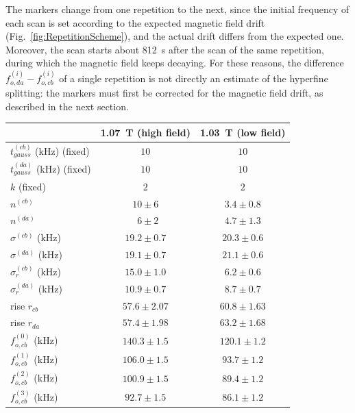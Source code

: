 The markers change from one repetition to the next, since the initial frequency of each scan is set according to the expected magnetic field drift (Fig.~\ref{fig:RepetitionScheme}), and the actual drift differs from the expected one. Moreover, the \da scan starts about \SI{812}{\second} after the \cb scan of the same repetition, during which the magnetic field keeps decaying. For these reasons, the difference $f_{o,da}^{(i)} - f_{o,cb}^{(i)}$ of a single repetition is not directly an estimate of the hyperfine splitting: the markers must first be corrected for the magnetic field drift, as described in the next section.

\begin{table}[!h]
\centering
\begin{tabular}{l|cc}
\hline
\hline
\textbf{} & \textbf{\SI{1.07}{\tesla} (high field)}  &  \textbf{\SI{1.03}{\tesla} (low field)}  \\
\hline 
$t_{gauss}^{(cb)}$ (kHz) (fixed) & $10$ & $10$ \\
$t_{gauss}^{(da)}$ (kHz) (fixed) & $10$ & $10$ \\
\hline
$k$ (fixed) &  $2$ &  $2$ \\
$n^{(cb)}$                &  $ 10 \pm 6$	         & $ 3.4    \pm 0.8 $\\
$n^{(da)}$                &  $\phantom{0}6  \pm 2$   & $  4.7   \pm 1.3 $\\
$\sigma^{(cb)}$ (kHz)     &  $	19.2 \pm 0.7  $      & $ 20.3   \pm 0.6 $\\
$\sigma^{(da)}$ (kHz)     &  $	19.1 \pm 0.7  $      & $ 21.1  \pm 0.6 $\\
$\sigma^{(cb)}_{r}$ (kHz) & $	15.0 \pm 1.0 $       & $ 6.2    \pm 0.6  $\\
$\sigma^{(da)}_{r}$ (kHz) & $	10.9 \pm 0.7  $      & $ 8.7    \pm 0.7  $\\
\hline
rise $r_{cb}$             & $ 57.6 \pm 2.07$         & $ 60.8 \pm 1.63$ \\ 
rise $r_{da}$             & $ 57.4 \pm 1.98$          & $ 63.2 \pm 1.68$ \\
\hline
$f_{o,cb}^{(0)}$ (kHz) &   $ 140.3 \pm 1.5 $ & $ 120.1 \pm 1.2 $ \\
$f_{o,cb}^{(1)}$ (kHz) &   $ 106.0 \pm 1.5 $ & $ 93.7 \pm 1.2 $ \\
$f_{o,cb}^{(2)}$ (kHz) &   $ 100.9 \pm 1.5 $ & $ 89.4 \pm 1.2 $ \\
$f_{o,cb}^{(3)}$ (kHz) &   $ 92.7 \pm 1.5 $ & $ 86.1 \pm 1.2 $ \\

\end{tabular}
\end{table}
